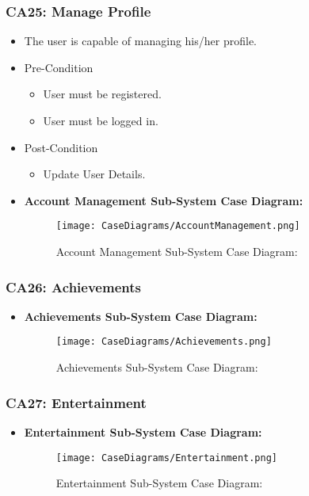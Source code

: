 \documentclass[12pt,a4paper]{article}
\begin{document}
		\subsubsection{CA25: Manage Profile}
			\begin{itemize}
				\item The user is capable of managing his/her profile.
					\item Pre-Condition
						\begin{itemize}
							\item User must be registered.
							\item User must be logged in.
						\end{itemize}
					\item Post-Condition
						\begin{itemize}
							\item Update User Details.
						\end{itemize}
				\item \textbf{Account Management Sub-System Case Diagram:}
				\begin{figure}[H]
					\texttt{[image: CaseDiagrams/AccountManagement.png]}
					\caption{Account Management Sub-System Case Diagram:}
				\end{figure}
			\end{itemize}
		\subsubsection{CA26: Achievements}
			\begin{itemize}
				\item \textbf{Achievements Sub-System Case Diagram:}
				\begin{figure}[H]
					\texttt{[image: CaseDiagrams/Achievements.png]}
					\caption{Achievements Sub-System Case Diagram:}
				\end{figure}
			\end{itemize}
		\subsubsection{CA27: Entertainment}
			\begin{itemize}
				\item \textbf{Entertainment Sub-System Case Diagram:}
				\begin{figure}[H]
					\texttt{[image: CaseDiagrams/Entertainment.png]}
					\caption{Entertainment Sub-System Case Diagram:}
				\end{figure}
			\end{itemize}
\end{document}
